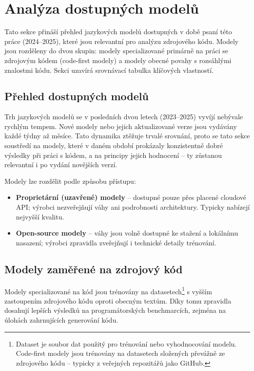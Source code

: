 \section{Analýza dostupných modelů}
\label{sec:selection-models}

Tato sekce přináší přehled jazykových modelů dostupných v době psaní této práce (2024--2025), které jsou relevantní pro analýzu zdrojového kódu.
Modely jsou rozděleny do dvou skupin: modely specializované primárně na práci se zdrojovým kódem (code-first modely) a modely obecné povahy s rozsáhlými znalostmi kódu.
Sekci uzavírá srovnávací tabulka klíčových vlastností.

\subsection{Přehled dostupných modelů}
\label{subsec:models-overview}

Trh jazykových modelů se v posledních dvou letech (2023--2025) vyvíjí nebývale rychlým tempem.
Nové modely nebo jejich aktualizované verze jsou vydávány každé týdny až měsíce.
Tato dynamika ztěžuje trvalé srovnání, proto se tato sekce soustředí na modely, které v daném období prokázaly konzistentně dobré výsledky při práci s kódem, a na principy jejich hodnocení -- ty zůstanou relevantní i po vydání novějších verzí.

Modely lze rozdělit podle způsobu přístupu:
\begin{itemize}
    \item \textbf{Proprietární (uzavřené) modely} -- dostupné pouze přes placené cloudové API; výrobci nezveřejňují váhy ani podrobnosti architektury. Typicky nabízejí nejvyšší kvalitu.
    \item \textbf{Open-source modely} -- váhy jsou volně dostupné ke stažení a lokálnímu nasazení; výrobci zpravidla zveřejňují i technické detaily trénování.
\end{itemize}

\subsection{Modely zaměřené na zdrojový kód}
\label{subsec:models-code-focused}

Modely specializované na kód jsou trénovány na datasetech\footnote{Dataset je soubor dat použitý pro trénování nebo vyhodnocování modelu. Code-first modely jsou trénovány na datasetech složených převážně ze zdrojového kódu -- typicky z veřejných repozitářů jako GitHub.}
s vyšším zastoupením zdrojového kódu oproti obecným textům.
Díky tomu zpravidla dosahují lepších výsledků na programátorských benchmarcích, zejména na úlohách zahrnujících generování kódu.

